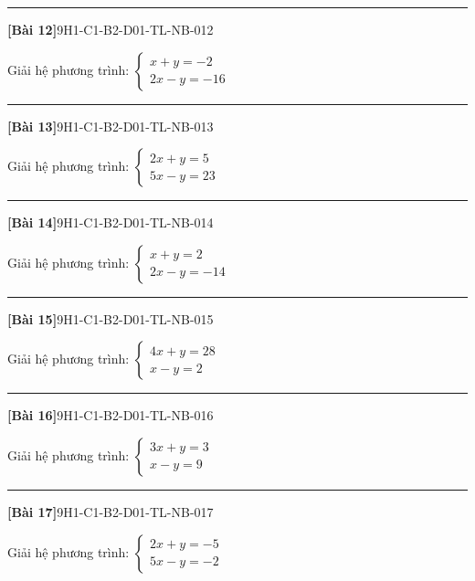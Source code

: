 \documentclass[12pt,a4paper]{article}
\newif\ifloigiai
\newenvironment{cauhoi}[2]{%
  \par\medskip\noindent\rule{\textwidth}{0.4pt}\par\nopagebreak
  \noindent\textbf{[#1]}\hfill{\scriptsize\ttfamily #2}\par\nopagebreak\smallskip}{\par}
\newcommand{\loigiai}[1]{\ifloigiai\par\smallskip\noindent\textit{Lời giải.} #1\par\fi}
\begin{document}
\begin{cauhoi}{Bài 12}{9H1-C1-B2-D01-TL-NB-012}
Giải hệ phương trình: $\begin{cases}x + y=-2\\ 2x - y=-16\end{cases}$
\loigiai{Cộng từng vế hai phương trình ta được $3x=-18$, suy ra $x=-6$. Thay vào phương trình thứ nhất: $1\cdot(-6)+y=-2$, suy ra $y=4$. Vậy hệ có nghiệm $(x;y)=(-6;4)$.}
\end{cauhoi}
\begin{cauhoi}{Bài 13}{9H1-C1-B2-D01-TL-NB-013}
Giải hệ phương trình: $\begin{cases}2x + y=5\\ 5x - y=23\end{cases}$
\loigiai{Cộng từng vế hai phương trình ta được $7x=28$, suy ra $x=4$. Thay vào phương trình thứ nhất: $2\cdot(4)+y=5$, suy ra $y=-3$. Vậy hệ có nghiệm $(x;y)=(4;-3)$.}
\end{cauhoi}
\begin{cauhoi}{Bài 14}{9H1-C1-B2-D01-TL-NB-014}
Giải hệ phương trình: $\begin{cases}x + y=2\\ 2x - y=-14\end{cases}$
\loigiai{Cộng từng vế hai phương trình ta được $3x=-12$, suy ra $x=-4$. Thay vào phương trình thứ nhất: $1\cdot(-4)+y=2$, suy ra $y=6$. Vậy hệ có nghiệm $(x;y)=(-4;6)$.}
\end{cauhoi}
\begin{cauhoi}{Bài 15}{9H1-C1-B2-D01-TL-NB-015}
Giải hệ phương trình: $\begin{cases}4x + y=28\\ x - y=2\end{cases}$
\loigiai{Cộng từng vế hai phương trình ta được $5x=30$, suy ra $x=6$. Thay vào phương trình thứ nhất: $4\cdot(6)+y=28$, suy ra $y=4$. Vậy hệ có nghiệm $(x;y)=(6;4)$.}
\end{cauhoi}
\begin{cauhoi}{Bài 16}{9H1-C1-B2-D01-TL-NB-016}
Giải hệ phương trình: $\begin{cases}3x + y=3\\ x - y=9\end{cases}$
\loigiai{Cộng từng vế hai phương trình ta được $4x=12$, suy ra $x=3$. Thay vào phương trình thứ nhất: $3\cdot(3)+y=3$, suy ra $y=-6$. Vậy hệ có nghiệm $(x;y)=(3;-6)$.}
\end{cauhoi}
\begin{cauhoi}{Bài 17}{9H1-C1-B2-D01-TL-NB-017}
Giải hệ phương trình: $\begin{cases}2x + y=-5\\ 5x - y=-2\end{cases}$
\loigiai{Cộng từng vế hai phương trình ta được $7x=-7$, suy ra $x=-1$. Thay vào phương trình thứ nhất: $2\cdot(-1)+y=-5$, suy ra $y=-3$. Vậy hệ có nghiệm $(x;y)=(-1;-3)$.}
\end{cauhoi}
\end{document}
